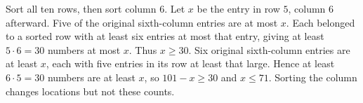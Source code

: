 Sort all ten rows, then sort column $6$. Let $x$ be the entry in row $5$, column $6$ afterward. Five of the original sixth-column entries are at most $x$. Each belonged to a sorted row with at least six entries at most that entry, giving at least $5\cdot 6=30$ numbers at most $x$. Thus $x\ge 30$. Six original sixth-column entries are at least $x$, each with five entries in its row at least that large. Hence at least $6\cdot 5=30$ numbers are at least $x$, so $101-x\ge 30$ and $x\le 71$. Sorting the column changes locations but not these counts.
